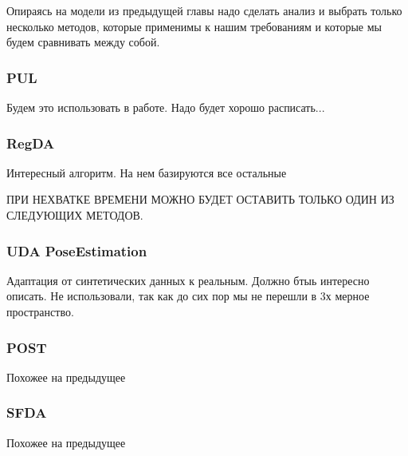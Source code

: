 Опираясь на модели из предыдущей главы надо сделать анализ и выбрать только несколько методов, которые применимы к нашим требованиям и которые мы будем сравнивать между собой.

\subsubsection{PUL}

Будем это использовать в работе. Надо будет хорошо расписать...

\subsubsection{RegDA}

Интересный алгоритм. На нем базируются все остальные

\hfill \break

ПРИ НЕХВАТКЕ ВРЕМЕНИ МОЖНО БУДЕТ ОСТАВИТЬ ТОЛЬКО ОДИН ИЗ СЛЕДУЮЩИХ МЕТОДОВ.

\subsubsection{UDA PoseEstimation}

Адаптация от синтетических данных к реальным. Должно бтыь интересно описать. Не использовали, так как до сих пор мы не перешли в 3х мерное пространство.

\subsubsection{POST}

Похожее на предыдущее

\subsubsection{SFDA}

Похожее на предыдущее


\newpage

